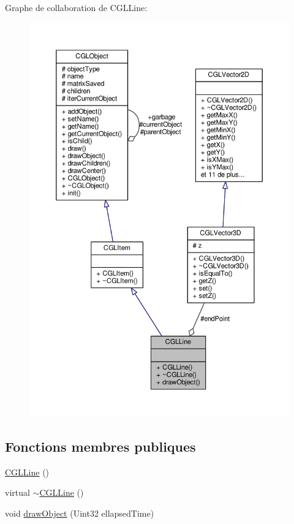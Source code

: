 Graphe de collaboration de C\-G\-L\-Line\-:
\nopagebreak
\begin{figure}[H]
\begin{center}
\leavevmode
\includegraphics[width=350pt]{db/d95/class_c_g_l_line__coll__graph}
\end{center}
\end{figure}
\subsection*{Fonctions membres publiques}
\begin{DoxyCompactItemize}
\item 
\hyperlink{class_c_g_l_line_ab220112ce9d381cc057e6cff09fd95a7}{C\-G\-L\-Line} ()
\item 
virtual \hyperlink{class_c_g_l_line_ae00c52a8b8890cbe7657862aad150022}{$\sim$\-C\-G\-L\-Line} ()
\item 
void \hyperlink{class_c_g_l_line_a9621fa37a8b87f06e2a67aa8bf17d957}{draw\-Object} (Uint32 ellapsed\-Time)
\end{DoxyCompactItemize}
